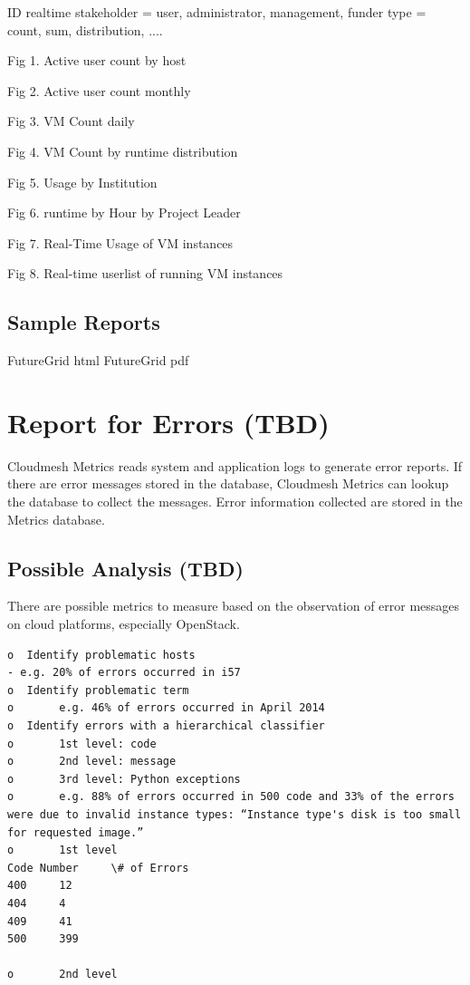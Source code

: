 \documentclass{sig-alternate-05-2015}
\begin{document}
ID
realtime
stakeholder = user, administrator, management, funder
type = count, sum, distribution, ....

Fig 1. Active user count by host                  

Fig 2. Active user count monthly

Fig 3. VM Count daily
 
Fig 4. VM Count by runtime distribution

Fig 5. Usage by Institution
 
Fig 6. runtime by Hour by Project Leader

Fig 7. Real-Time Usage of VM instances
 
Fig 8. Real-time userlist of running VM instances

\subsection{Sample Reports}

FutureGrid html \cite{LeeFGresourceWeb}
 FutureGrid pdf \cite{LeeFGresource}

\section{Report for Errors (TBD)}

Cloudmesh Metrics reads system and application logs to generate error reports. If there are error messages stored in the database, Cloudmesh Metrics can lookup the database to collect the messages. Error information collected are stored in the Metrics database.

\subsection{Possible Analysis (TBD)}

There are possible metrics to measure based on the observation of error messages on cloud platforms, especially OpenStack.

\begin{verbatim}
o  Identify problematic hosts
- e.g. 20% of errors occurred in i57
o  Identify problematic term
o       e.g. 46% of errors occurred in April 2014
o  Identify errors with a hierarchical classifier
o       1st level: code
o       2nd level: message
o       3rd level: Python exceptions
o       e.g. 88% of errors occurred in 500 code and 33% of the errors were due to invalid instance types: “Instance type's disk is too small for requested image.”
o       1st level
Code Number     \# of Errors
400     12
404     4
409     41
500     399

o       2nd level
\end{verbatim}
\end{document}
